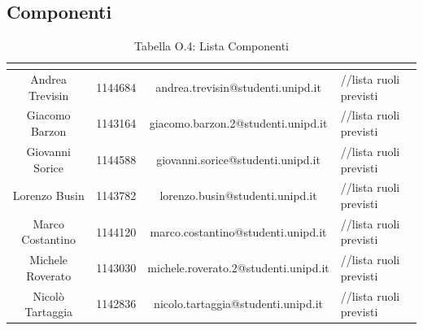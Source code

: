 \subsection{Componenti}
\renewcommand{\arraystretch}{2}
\begin{table}[H]
\begin{center}
  \begin{tabular}{| c | c | c | p{3cm} |}
    \hline
    \rowcolor{title_row}
    \textbf{\color{title_text}{Nominativo}} & \textbf{\color{title_text}{Matricola}} & \textbf{\color{title_text}{Email}} & \textbf{\color{title_text}{Ruoli previsti}} \\ \hline
    Andrea Trevisin & 1144684 & andrea.trevisin@studenti.unipd.it & //lista ruoli previsti   \\ \hline
    Giacomo Barzon & 1143164 & giacomo.barzon.2@studenti.unipd.it & //lista ruoli previsti \\ \hline
    Giovanni Sorice & 1144588 & giovanni.sorice@studenti.unipd.it & //lista ruoli previsti \\ \hline
    Lorenzo Busin & 1143782 & lorenzo.busin@studenti.unipd.it & //lista ruoli previsti \\ \hline
    Marco Costantino & 1144120 & marco.costantino@studenti.unipd.it & //lista ruoli previsti \\ \hline
    Michele Roverato & 1143030 & michele.roverato.2@studenti.unipd.it & //lista ruoli previsti \\ \hline
    Nicolò Tartaggia & 1142836 & nicolo.tartaggia@studenti.unipd.it & //lista ruoli previsti \\ 
    \hline
  \end{tabular}
  \caption{Tabella O.4: Lista Componenti\label{}}
\end{center}
\end{table}
\renewcommand{\arraystretch}{1}
\pagebreak